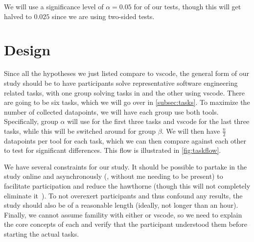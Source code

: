 \documentclass[../thesis]{subfiles}
\begin{document}
We will use a significance level of $\alpha = 0.05$ for  of our tests, though this will get halved to $0.025$ since we are using two-sided tests.

\section{Design}\label{sec:design}
Since all the hypotheses we just listed compare \SEE{} to \gls{vscode}, the general form of our study should be to have participants solve representative software engineering related tasks, with one group solving tasks in \SEE{} and the other using \gls{vscode}.
There are going to be six tasks, which we will go over in \cref{subsec:tasks}.
To maximize the number of collected datapoints, we will have each group use both tools.
Specifically, group $\alpha$ will use \SEE{} for the first three tasks and \gls{vscode} for the last three tasks, while this will be switched around for group $\beta$.
We will then have $\frac{n}{2}$ datapoints per tool for each task, which we can then compare against each other to test for significant differences.
This flow is illustrated in \cref{fig:taskflow}.

We have several constraints for our study.
It should be possible to partake in the study online and asynchronously (\ie, without me needing to be present) to facilitate participation and reduce the \gls{hawthorne} (though this will not completely eliminate it~\cite[\eg][]{evans2010}).
To not overexert participants and thus confound any results, the study should also be of a reasonable length (ideally, not longer than an hour).
Finally, we cannot assume famility with either \SEE{} or \gls{vscode}, so we need to explain the core concepts of each and verify that the participant understood them before starting the actual tasks.
\end{document}
